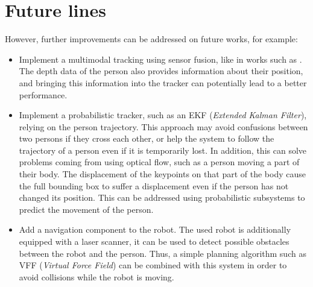 \newpage
\section{Future lines}
However, further improvements can be addressed on future works, for example:

\begin{itemize}
	\item Implement a multimodal tracking using sensor fusion, like in works such as \cite{rgbd_tracking}. The depth data of the person also provides information about their position, and bringing this information into the tracker can potentially lead to a better performance.
	
	\item Implement a probabilistic tracker, such as an EKF (\textit{Extended Kalman Filter}), relying on the person trajectory. This approach may avoid confusions between two persons if they cross each other, or help the system to follow the trajectory of a person even if it is temporarily lost. In addition, this can solve problems coming from using optical flow, such as a person moving a part of their body. The displacement of the keypoints on that part of the body cause the full bounding box to suffer a displacement even if the person has not changed its position. This can be addressed using probabilistic subsystems to predict the movement of the person.
		
	\item Add a navigation component to the robot. The used robot is additionally equipped with a laser scanner, it can be used to detect possible obstacles between the robot and the person. Thus, a simple planning algorithm such as VFF (\textit{Virtual Force Field}) can be combined with this system in order to avoid collisions while the robot is moving.
\end{itemize}








